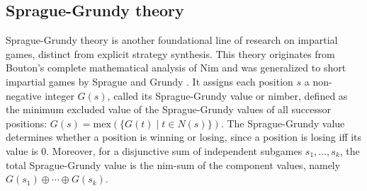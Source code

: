 \documentclass[review]{elsarticle}
\begin{document}
\subsection{Sprague-Grundy theory}

Sprague-Grundy theory is another foundational line of research on impartial games, distinct from explicit strategy synthesis. 
This theory originates from Bouton's complete mathematical analysis of Nim \cite{Bou1901} and was generalized to short impartial games by Sprague \cite{sprague1935} and Grundy \cite{grundy1939}. 
It assigns each position $s$ a non-negative integer $G(s)$, called its Sprague-Grundy value or nimber, defined as the minimum excluded value of the Sprague-Grundy values of all successor positions:
$G(s) = \text{mex}(\{G(t) \mid t \in N(s)\})$.
The Sprague-Grundy value determines whether a position is winning or losing, since a position is losing iff its value is $0$.
Moreover, for a disjunctive sum of independent subgames $s_1,\ldots,s_k$, the total Sprague-Grundy value is the nim-sum of the component values, namely $G(s_1) \oplus \cdots \oplus G(s_k)$.
\end{document}
